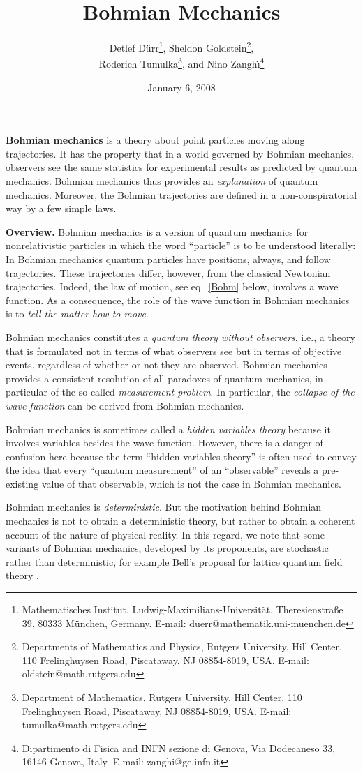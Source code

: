 \documentclass[12pt]{report}
\title{Bohmian Mechanics}
\author{
   Detlef D\"urr\footnote{Mathematisches Institut, Ludwig-Maximilians-Universit\"{a}t,
         Theresienstra{\ss}e 39, 80333 M\"{u}nchen, Germany.
         E-mail: duerr@mathematik.uni-muenchen.de},
   Sheldon Goldstein\footnote{Departments of Mathematics and Physics,
         Rutgers University, Hill Center, 
         110 Frelinghuysen Road, Piscataway, NJ 08854-8019, USA.
         E-mail: oldstein@math.rutgers.edu},\\
   Roderich Tumulka\footnote{Department of Mathematics,
         Rutgers University, Hill Center, 
         110 Frelinghuysen Road, Piscataway, NJ 08854-8019, USA.
         E-mail: tumulka@math.rutgers.edu}, and
   Nino Zangh\`\i\footnote{Dipartimento di Fisica and INFN sezione di
         Genova, Via Dodecaneso 33, 16146 Genova, Italy. E-mail: 
         zanghi@ge.infn.it}
}
\date{January 6, 2008}
\begin{document}
\maketitle

\noindent \textbf{Bohmian mechanics} is a theory about point  particles moving along trajectories. It has the property that in a world governed by Bohmian mechanics, observers see the same statistics for experimental results as predicted by quantum mechanics. Bohmian mechanics thus provides an \emph{explanation} of quantum mechanics.  Moreover, the Bohmian trajectories are defined in a non-conspiratorial way by a few simple laws.


\bigskip

\noindent\textbf{Overview.}
          Bohmian mechanics is a version of quantum mechanics for
          nonrelativistic particles in which the word ``particle'' is to be
          understood literally: In Bohmian mechanics quantum particles have
          positions, always, and follow trajectories.
These trajectories differ, however, from the classical Newtonian trajectories. Indeed, the law of motion, see eq.~\eqref{Bohm} below, involves a wave function. As a consequence, the role of the wave function in Bohmian mechanics is to \emph{tell the matter how to move}. 

Bohmian mechanics constitutes a \emph{quantum theory without observers}, i.e., a theory that is formulated not in terms of what observers see but in terms of objective events, regardless of whether or not they are observed. Bohmian mechanics provides a consistent resolution of all paradoxes of quantum mechanics, in particular of the so-called \emph{measurement problem}. In particular, the \emph{collapse of the wave function} can be derived from Bohmian mechanics.

Bohmian mechanics is sometimes called a \emph{hidden variables theory} because it involves variables besides the wave function. However, there is a danger of confusion here because the term ``hidden variables theory'' is often used to convey the idea that every ``quantum measurement'' of an ``observable'' reveals a pre-existing value of that observable, which is not the case in Bohmian mechanics.

Bohmian mechanics is \emph{deterministic}.  But the motivation behind Bohmian mechanics is not to obtain a deterministic theory, but rather to obtain a coherent account of the nature of physical reality. In this regard, we note that some variants of Bohmian mechanics, developed by its proponents, are stochastic rather than deterministic, for example Bell's proposal for lattice quantum field theory \cite{Bell86}. 
\end{document}
